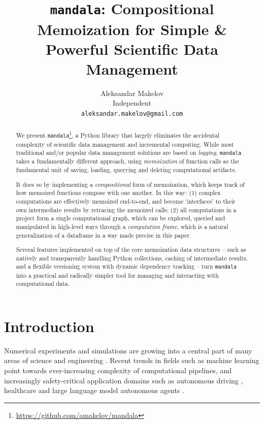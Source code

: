 \documentclass{article} %
\title{\texttt{mandala}: Compositional Memoization for Simple \&
Powerful Scientific Data Management}
\author{Aleksandar Makelov\\
Independent \\
\texttt{aleksandar.makelov@gmail.com}
}
\begin{document}
\maketitle


\begin{abstract}
  We present
  \texttt{mandala}\footnote{\url{https://github.com/amakelov/mandala}}, a Python
  library that largely eliminates the accidental complexity of scientific data
  management and incremental computing. While most traditional and/or
  popular data management solutions are based on \emph{logging},
  \texttt{mandala} takes a fundamentally different approach, using
  \emph{memoization} of function calls as the fundamental unit of saving,
  loading, querying and deleting computational artifacts. 
  
  It does so by implementing a \emph{compositional} form of memoization, which keeps
  track of how memoized functions compose with one another. In this way: (1)
  complex computations are effectively memoized end-to-end, and become
  `interfaces' to their own intermediate results by retracing the memoized
  calls; (2) all computations in a project form a single computational graph,
  which can be explored, queried and manipulated in high-level ways through a
  \emph{computation frame}, which is a natural generalization of a dataframe in
  a way made precise in this paper. 

  Several features implemented on top of the core memoization data structures --
  such as natively and transparently handling Python collections, caching of
  intermediate results, and a flexible versioning system with dynamic dependency
  tracking -- turn \texttt{mandala} into a practical and radically simpler tool
  for managing and interacting with computational data.
\end{abstract}

\section{Introduction}
\label{section:}

Numerical experiments and simulations are growing into a central part of many
areas of science and engineering \citep{hey2009fourth}. Recent trends in
fields such as machine learning point towards ever-increasing complexity of
computational pipelines, and increasingly safety-critical application domains
such as autonomous driving \citep{bojarski2016end}, healthcare
\citep{ravi2016deep,abramson2024accurate} and large language model autonomous
agents \citep{yang2024swe}.
\end{document}

